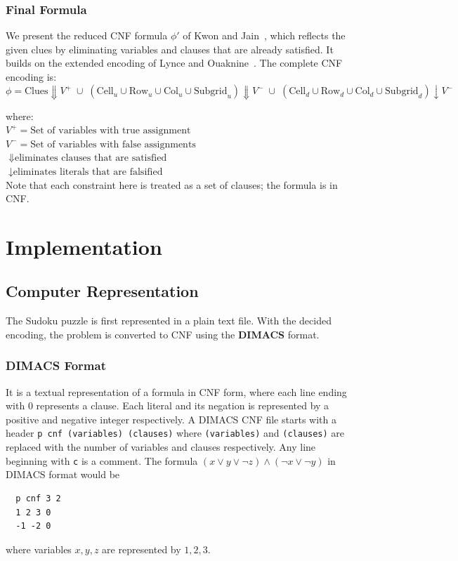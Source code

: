 \documentclass[12pt]{article}
\begin{document}
\subsubsection{Final Formula}
We present the reduced CNF formula $\phi'$ of Kwon and Jain~\citep{KwonJain2006}, which reflects the given clues by eliminating variables and clauses that are already satisfied. It builds on the extended encoding of Lynce and Ouaknine~\citep{SuSAT}. The complete CNF encoding is:
\[
\phi = \text{Clues} \Downarrow V^{+}
\;\cup\;
\left( \text{Cell}_{u} \cup \text{Row}_{u} \cup \text{Col}_{u} \cup \text{Subgrid}_{u} \right) \Downarrow V^{-}
\;\cup\;
\left( \text{Cell}_{d} \cup \text{Row}_{d} \cup \text{Col}_{d} \cup \text{Subgrid}_{d} \right) \downarrow V^{-}
\]

where:\\
$V^+ = \text{Set of variables with true assignment}$\\
$V^- = \text{Set of variables with false assignments}$\\ 
$\Downarrow \text{eliminates clauses that are satisfied}$ \\
$\downarrow \text{eliminates literals that are falsified}$\\
Note that each constraint here is treated as a set of clauses; the formula is in CNF.


\section{Implementation}

\subsection{Computer Representation}

The Sudoku puzzle is first represented in a plain text file. 
With the decided encoding, the problem is converted to CNF using the \textbf{DIMACS} format.
\subsubsection{DIMACS Format}
It is a textual representation of a formula in CNF form, where each line ending with 0 represents a clause. Each literal and its negation is represented by a positive and negative integer respectively.
A DIMACS CNF file starts with a header \texttt{p cnf (variables) (clauses)} where \texttt{(variables)} and \texttt{(clauses)} are replaced with the number of variables and clauses respectively. Any line beginning with \texttt{c} is a comment.
The formula $( x \vee y \vee \neg z ) \land (\neg x \vee \neg y )$ in DIMACS format would be 
\begin{verbatim}
  p cnf 3 2
  1 2 3 0
  -1 -2 0
\end{verbatim}
where variables $x,y,z$ are represented by $1,2,3$.
\end{document}
